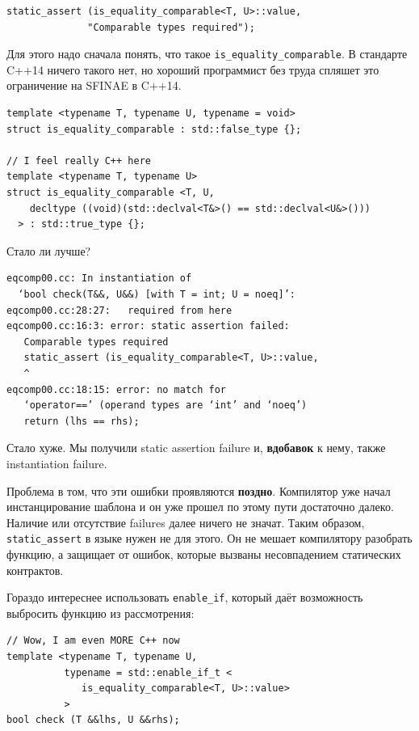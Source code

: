 \documentclass[a4paper,12pt,oneside]{book}
\begin{document}
\begin{lstlisting}
static_assert (is_equality_comparable<T, U>::value, 
              "Comparable types required");
\end{lstlisting}

Для этого надо сначала понять, что такое \lstinline!is_equality_comparable!. В стандарте C++14 ничего такого нет, но хороший программист без труда спляшет это ограничение на SFINAE в C++14.

\begin{lstlisting}
template <typename T, typename U, typename = void>
struct is_equality_comparable : std::false_type {};

// I feel really C++ here
template <typename T, typename U>
struct is_equality_comparable <T, U,
    decltype ((void)(std::declval<T&>() == std::declval<U&>()))
  > : std::true_type {};
\end{lstlisting}

Стало ли лучше?

\begin{verbatim}
eqcomp00.cc: In instantiation of 
  ‘bool check(T&&, U&&) [with T = int; U = noeq]’:
eqcomp00.cc:28:27:   required from here
eqcomp00.cc:16:3: error: static assertion failed: 
   Comparable types required
   static_assert (is_equality_comparable<T, U>::value, 
   ^
eqcomp00.cc:18:15: error: no match for 
   ‘operator==’ (operand types are ‘int’ and ‘noeq’)
   return (lhs == rhs);
\end{verbatim}

Стало хуже. Мы получили static assertion failure и, \textbf{вдобавок} к нему, также instantiation failure.

Проблема в том, что эти ошибки проявляются \textbf{поздно}. Компилятор уже начал инстанцирование шаблона и он уже прошел по этому пути достаточно далеко. Наличие или отсутствие failures далее ничего не значат. Таким образом, \lstinline!static_assert! в языке нужен не для этого. Он не мешает компилятору разобрать функцию, а защищает от ошибок, которые вызваны несовпадением статических контрактов.

Гораздо интереснее использовать \lstinline!enable_if!, который даёт возможность выбросить функцию из рассмотрения:

\begin{lstlisting}
// Wow, I am even MORE C++ now
template <typename T, typename U,
          typename = std::enable_if_t <
             is_equality_comparable<T, U>::value>
          >
bool check (T &&lhs, U &&rhs);
\end{lstlisting}
\end{document}
